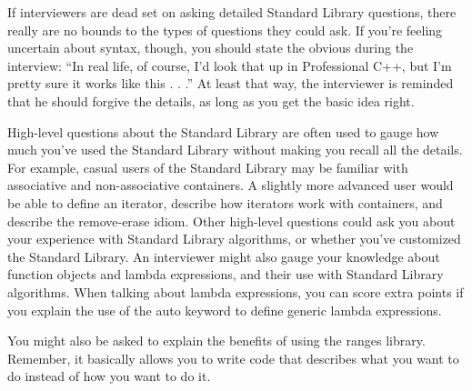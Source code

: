 
If interviewers are dead set on asking detailed Standard Library questions, there really are no bounds to the types of questions they could ask. If you’re feeling uncertain about syntax, though, you should state the obvious during the interview: “In real life, of course, I’d look that up in Professional C++, but I’m pretty sure it works like this . . .” At least that way, the interviewer is reminded that he should forgive the details, as long as you get the basic idea right.

High-level questions about the Standard Library are often used to gauge how much you’ve used the Standard Library without making you recall all the details. For example, casual users of the Standard Library may be familiar with associative and non-associative containers. A slightly more advanced user would be able to define an iterator, describe how iterators work with containers, and describe the remove-erase idiom. Other high-level questions could ask you about your experience with Standard Library algorithms, or whether you’ve customized the Standard Library. An interviewer might also gauge your knowledge about function objects and lambda expressions, and their use with Standard Library algorithms. When talking about lambda expressions, you can score extra points if you explain the use of the auto keyword to define generic lambda expressions.

You might also be asked to explain the benefits of using the ranges library. Remember, it basically allows you to write code that describes what you want to do instead of how you want to do it.












